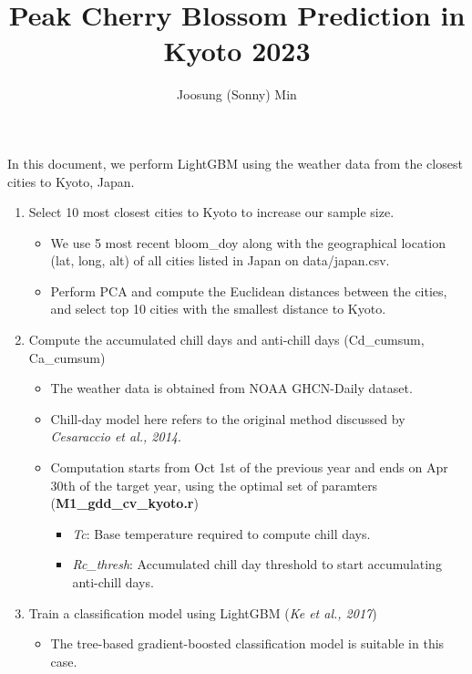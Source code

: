 \documentclass[
]{article}
\title{Peak Cherry Blossom Prediction in Kyoto 2023}
\author{Joosung (Sonny) Min}
\date{}
\begin{document}
\maketitle

In this document, we perform LightGBM using the weather data from the
closest cities to Kyoto, Japan.

\begin{enumerate}
\def\labelenumi{\arabic{enumi}.}
\item
  Select 10 most closest cities to Kyoto to increase our sample size.

  \begin{itemize}
  \item
    We use 5 most recent bloom\_doy along with the geographical location
    (lat, long, alt) of all cities listed in Japan on data/japan.csv.
  \item
    Perform PCA and compute the Euclidean distances between the cities,
    and select top 10 cities with the smallest distance to Kyoto.
  \end{itemize}
\item
  Compute the accumulated chill days and anti-chill days (Cd\_cumsum,
  Ca\_cumsum)

  \begin{itemize}
  \item
    The weather data is obtained from NOAA GHCN-Daily dataset.
  \item
    Chill-day model here refers to the original method discussed by
    \emph{Cesaraccio et al., 2014}.
  \item
    Computation starts from Oct 1st of the previous year and ends on Apr
    30th of the target year, using the optimal set of paramters
    (\textbf{M1\_gdd\_cv\_kyoto.r})

    \begin{itemize}
    \item
      \emph{Tc}: Base temperature required to compute chill days.
    \item
      \emph{Rc\_thresh}: Accumulated chill day threshold to start
      accumulating anti-chill days.
    \end{itemize}
  \end{itemize}
\item
  Train a classification model using LightGBM (\emph{Ke et al., 2017})

  \begin{itemize}
  \item
    The tree-based gradient-boosted classification model is suitable in
    this case.


\end{itemize}
\end{enumerate}
\end{document}

